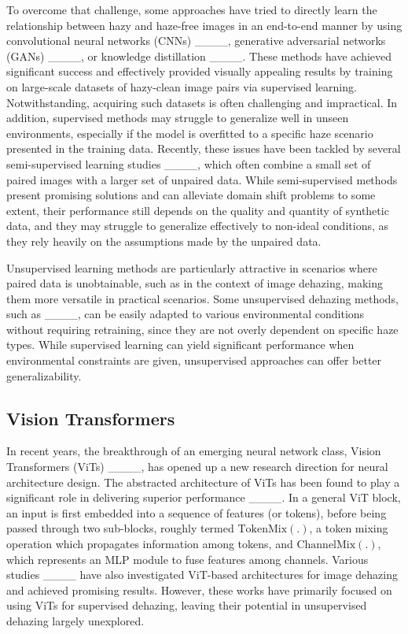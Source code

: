 To overcome that challenge, some approaches have tried to directly learn the relationship between hazy and haze-free images in an end-to-end manner by using convolutional neural networks (CNNs) ____, generative adversarial networks (GANs) ____, or knowledge distillation ____. These methods have achieved significant success and effectively provided visually appealing results by training on large-scale datasets of hazy-clean image pairs via supervised learning. Notwithstanding, acquiring such datasets is often challenging and impractical. In addition, supervised methods may struggle to generalize well in unseen environments, especially if the model is overfitted to a specific haze scenario presented in the training data. Recently, these issues have been tackled by several semi-supervised learning studies ____, which often combine a small set of paired images with a larger set of unpaired data. While semi-supervised methods present promising solutions and can alleviate domain shift problems to some extent, their performance still depends on the quality and quantity of synthetic data, and they may struggle to generalize effectively to non-ideal conditions, as they rely heavily on the assumptions made by the unpaired data.

Unsupervised learning methods are particularly attractive in scenarios where paired data is unobtainable, such as in the context of image dehazing, making them more versatile in practical scenarios. Some unsupervised dehazing methods, such as ____, can be easily adapted to various environmental conditions without requiring retraining, since they are not overly dependent on specific haze types. While supervised learning can yield significant performance when environmental constraints are given, unsupervised approaches can offer better generalizability. 


\subsection{Vision Transformers}
\label{subsec:vit}

In recent years, the breakthrough of an emerging neural network class, Vision Transformers (ViTs) ____, has opened up a new research direction for neural architecture design. The abstracted architecture of ViTs has been found to play a significant role in delivering superior performance ____. In a general ViT block, an input is first embedded into a sequence of features (or tokens), before being passed through two sub-blocks, roughly termed $\mathrm{TokenMix}(.)$, a token mixing operation which propagates information among tokens, and $\mathrm{ChannelMix}(.)$, which represents an MLP module to fuse features among channels. Various studies ____ have also investigated ViT-based architectures for image dehazing and achieved promising results. However, these works have primarily focused on using ViTs for supervised dehazing, leaving their potential in unsupervised dehazing largely unexplored.


